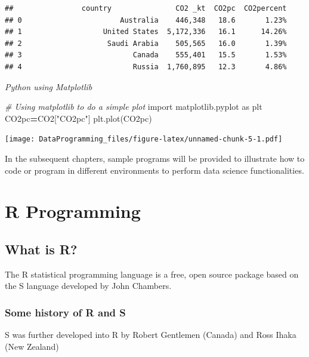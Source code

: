 \documentclass[]{book}
\newenvironment{Shaded}{\begin{snugshade}}{\end{snugshade}}
\newcommand{\CommentTok}[1]{\textcolor[rgb]{0.56,0.35,0.01}{\textit{#1}}}
\newcommand{\ImportTok}[1]{#1}
\newcommand{\NormalTok}[1]{#1}
\newcommand{\OperatorTok}[1]{\textcolor[rgb]{0.81,0.36,0.00}{\textbf{#1}}}
\newcommand{\StringTok}[1]{\textcolor[rgb]{0.31,0.60,0.02}{#1}}
\begin{document}
\begin{verbatim}
##                country               CO2 _kt  CO2pc  CO2percent
## 0                       Australia    446,348   18.6       1.23%
## 1                   United States  5,172,336   16.1      14.26%
## 2                    Saudi Arabia    505,565   16.0       1.39%
## 3                          Canada    555,401   15.5       1.53%
## 4                          Russia  1,760,895   12.3       4.86%
\end{verbatim}

\emph{Python using Matplotlib}

\begin{Shaded}
\begin{Highlighting}[]
\CommentTok{# Using matplotlib to do a simple plot}
\ImportTok{import}\NormalTok{ matplotlib.pyplot }\ImportTok{as}\NormalTok{ plt}
\NormalTok{CO2pc}\OperatorTok{=}\NormalTok{CO2[}\StringTok{"CO2pc"}\NormalTok{]}
\NormalTok{plt.plot(CO2pc)}
\end{Highlighting}
\end{Shaded}

\texttt{[image: DataProgramming\_files/figure-latex/unnamed-chunk-5-1.pdf]}

In the subsequent chapters, sample programs will be provided to illustrate how to code or program in different environments to perform data science functionalities.

\hypertarget{r-programming}{%
\chapter{R Programming}\label{r-programming}}

\hypertarget{what-is-r}{%
\section{What is R?}\label{what-is-r}}

The R statistical programming language is a free, open source package based on the S language developed by John Chambers.

\hypertarget{some-history-of-r-and-s}{%
\subsection{Some history of R and S}\label{some-history-of-r-and-s}}

S was further developed into R by Robert Gentlemen (Canada) and Ross Ihaka (New Zealand)
\end{document}
